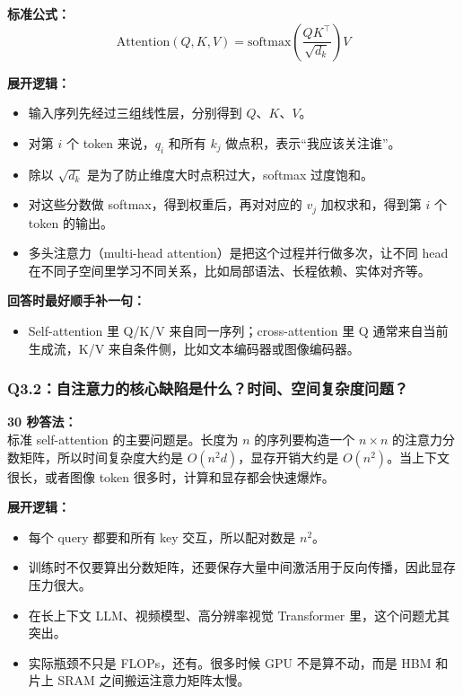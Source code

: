 \textbf{标准公式：}
\[
\mathrm{Attention}(Q,K,V)=\mathrm{softmax}\left(\frac{QK^\top}{\sqrt{d_k}}\right)V
\]

\textbf{展开逻辑：}
\begin{itemize}[leftmargin=1.5em]
  \item 输入序列先经过三组线性层，分别得到 $Q$、$K$、$V$。
  \item 对第 $i$ 个 token 来说，$q_i$ 和所有 $k_j$ 做点积，表示“我应该关注谁”。
  \item 除以 $\sqrt{d_k}$ 是为了防止维度大时点积过大，softmax 过度饱和。
  \item 对这些分数做 softmax，得到权重后，再对对应的 $v_j$ 加权求和，得到第 $i$ 个 token 的输出。
  \item 多头注意力（multi-head attention）是把这个过程并行做多次，让不同 head 在不同子空间里学习不同关系，比如局部语法、长程依赖、实体对齐等。
\end{itemize}

\textbf{回答时最好顺手补一句：}
\begin{itemize}[leftmargin=1.5em]
  \item Self-attention 里 Q/K/V 来自同一序列；cross-attention 里 Q 通常来自当前生成流，K/V 来自条件侧，比如文本编码器或图像编码器。
\end{itemize}

\subsubsection{Q3.2：自注意力的核心缺陷是什么？时间、空间复杂度问题？}

\begin{conceptbox}
\textbf{30 秒答法：}\\
标准 self-attention 的主要问题是。长度为 $n$ 的序列要构造一个 $n \times n$ 的注意力分数矩阵，所以时间复杂度大约是 $O(n^2 d)$，显存开销大约是 $O(n^2)$。当上下文很长，或者图像 token 很多时，计算和显存都会快速爆炸。
\end{conceptbox}

\textbf{展开逻辑：}
\begin{itemize}[leftmargin=1.5em]
  \item 每个 query 都要和所有 key 交互，所以配对数是 $n^2$。
  \item 训练时不仅要算出分数矩阵，还要保存大量中间激活用于反向传播，因此显存压力很大。
  \item 在长上下文 LLM、视频模型、高分辨率视觉 Transformer 里，这个问题尤其突出。
  \item 实际瓶颈不只是 FLOPs，还有。很多时候 GPU 不是算不动，而是 HBM 和片上 SRAM 之间搬运注意力矩阵太慢。
\end{itemize}

